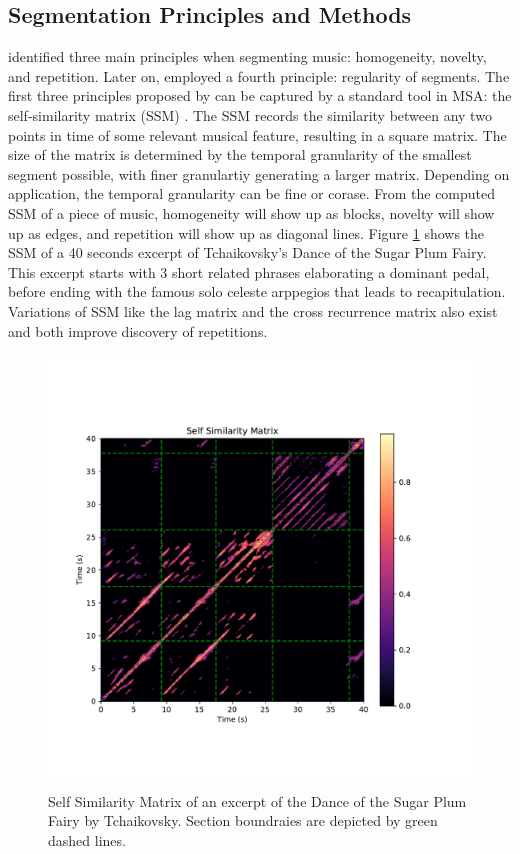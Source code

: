 
\subsection{Segmentation Principles and Methods}

\cite{paulus2010audio} identified three main principles when segmenting music: homogeneity, novelty, and repetition.
Later on, \cite{sargent2011regularity} emplo­yed a fourth principle: regularity of segments.
The first three principles proposed by \citeauthor{paulus2010audio} can be captured by a standard tool in MSA: the self-similarity matrix (SSM) \citep{foote1999visualizing}.
The SSM records the similarity between any two points in time of some relevant musical feature, resulting in a square matrix.
The size of the matrix is determined by the temporal granularity of the smallest segment possible, with finer granulartiy generating a larger matrix.
Depending on application, the temporal granularity can be fine or corase.
From the computed SSM of a piece of music, homogeneity will show up as blocks, novelty will show up as edges, and repetition will show up as diagonal lines.
Figure \ref{fig:ssm} shows the SSM of a 40 seconds excerpt of Tchaikovsky's Dance of the Sugar Plum Fairy.
This excerpt starts with 3 short related phrases elaborating a dominant pedal, before ending with the famous solo celeste arppegios that leads to recapitulation.  
Variations of SSM like the lag matrix \citep{goto2003lag} and the cross recurrence matrix \citep{serra2009cross} also exist and both improve discovery of repetitions.
\begin{figure}[H]
    \centering
    \includegraphics[height=4.5in]{ssm.pdf}
    \caption{Self Similarity Matrix of an excerpt of the Dance of the Sugar Plum Fairy by Tchaikovsky. Section boundraies are depicted by green dashed lines.}
    \label{fig:ssm}
\end{figure}

